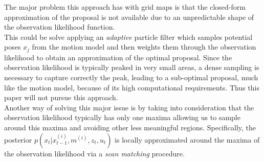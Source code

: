 \documentclass[letterpaper]{article}
\begin{document}
The major problem this approach has with grid maps is that the closed-form approximation of the proposal is not available due to an unpredictable shape of the observation likelihood function.\\ This could be solve applying an \textit{adaptive} particle filter which samples potential poses $x_j$ from the motion model and then weights them through the observation likelihood to obtain an approximation of the optimal proposal. Since the observation likelihood is typically peaked in very small areas, a dense sampling is necessary to capture correctly the peak, leading to a sub-optimal proposal, much like the motion model, because of its high computational requirements. Thus this paper will not pursue this approach.\\
Another way of solving this major issue is by taking into consideration that the observation likelihood typically has only one maxima allowing us to sample around this maxima and avoiding other less meaningful regions. Specifically, the posterior $p(x_t|x_{t-1}^{(i)}, m^{(i)}, z_t, u_t)$ is locally approximated around the maxima of the observation likelihood via a \textit{scan matching} procedure. 
\end{document}
